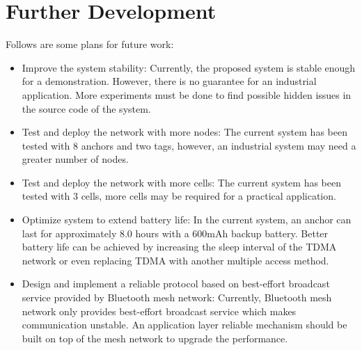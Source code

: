 \documentclass[\main/main.tex]{subfiles}
\begin{document}
\section{Further Development}
Follows are some plans for future work:
\begin{itemize}
    \item Improve the system stability: Currently, the proposed system is stable enough for a demonstration. However, there is no guarantee for an industrial application. More experiments must be done to find possible hidden issues in the source code of the system.
    \item Test and deploy the network with more nodes: The current system has been tested with 8 anchors and two tags, however, an industrial system may need a greater number of nodes.
    \item Test and deploy the network with more cells: The current system has been tested with 3 cells, more cells may be required for a practical application.
    \item Optimize system to extend battery life: In the current system, an anchor can last for approximately 8.0 hours with a 600mAh backup battery. Better battery life can be achieved by increasing the sleep interval of the TDMA network or even replacing TDMA with another multiple access method.
    \item Design and implement a reliable protocol based on best-effort broadcast service provided by Bluetooth mesh network: Currently, Bluetooth mesh network only provides best-effort broadcast service which makes communication unstable. An application layer reliable mechanism should be built on top of the mesh network to upgrade the performance.
\end{itemize}
\end{document}
